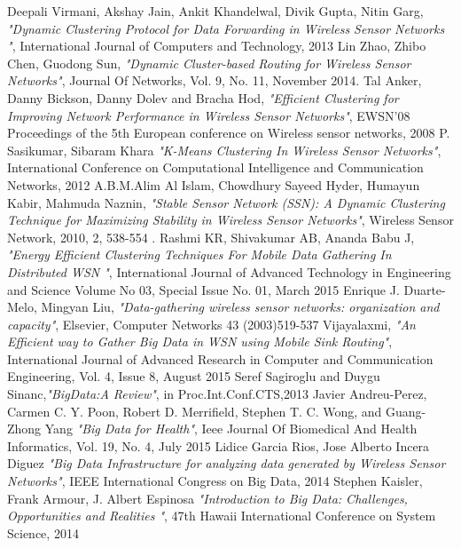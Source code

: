 \documentclass[MTech]{iitmdiss}
\begin{document}
\begin{singlespace}
\begin{thebibliography}{1}
\bibitem{}
Deepali Virmani, Akshay Jain, Ankit Khandelwal, Divik Gupta, Nitin Garg, \textit{"Dynamic Clustering Protocol for Data Forwarding in 
Wireless Sensor Networks
"}, International Journal of Computers and Technology, 2013
\bibitem{}
Lin Zhao, Zhibo Chen, Guodong Sun, \textit{"Dynamic Cluster-based Routing for Wireless
Sensor Networks"}, Journal Of Networks, Vol. 9, No. 11, November 2014.
\bibitem{}
Tal Anker, Danny Bickson, Danny Dolev and Bracha Hod, \textit{"Efficient Clustering for Improving Network Performance in Wireless Sensor Networks"}, EWSN'08 Proceedings of the 5th European conference on Wireless sensor networks, 2008
\bibitem{}
P. Sasikumar, Sibaram Khara \textit{"K-Means Clustering In Wireless Sensor Networks"}, International Conference on Computational Intelligence and Communication Networks, 2012
\bibitem{}
A.B.M.Alim Al Islam, Chowdhury Sayeed Hyder, Humayun Kabir, Mahmuda Naznin, \textit{"Stable Sensor Network (SSN): A Dynamic Clustering 
Technique for Maximizing Stability in Wireless 
Sensor Networks"}, Wireless Sensor Network, 2010, 2, 538-554 .
\bibitem{}
Rashmi KR, Shivakumar AB, Ananda Babu J, \textit{"Energy Efficient Clustering Techniques 
For Mobile Data Gathering In Distributed 
WSN
"}, International Journal of Advanced Technology in Engineering and Science
Volume No 03, Special Issue No. 01, March 2015 
\bibitem{}
Enrique J. Duarte-Melo, Mingyan Liu, \textit{"Data-gathering wireless sensor networks: organization
and capacity"}, Elsevier, Computer Networks 43 (2003)519-537 
\bibitem{}
Vijayalaxmi, \textit{"An Efficient way to Gather Big Data in WSN 
using Mobile Sink Routing"}, International Journal of Advanced Research in Computer and Communication Engineering, Vol. 4, Issue 8, August 2015
\bibitem{}
Seref Sagiroglu and Duygu Sinanc,\textit{"BigData:A Review"}, in Proc.Int.Conf.CTS,2013
\bibitem{}
Javier Andreu-Perez, Carmen C. Y. Poon, Robert D. Merrifield, Stephen T. C. Wong,
and Guang-Zhong Yang \textit{"Big Data for Health"}, Ieee Journal Of Biomedical And Health Informatics, Vol. 19, No. 4, July 2015
\bibitem{}
Lidice Garcia Rios, Jose Alberto Incera Diguez \textit{"Big Data Infrastructure for analyzing data generated by Wireless Sensor Networks"}, IEEE International Congress on Big Data, 2014 
\bibitem{}
Stephen Kaisler, Frank Armour, J. Albert Espinosa \textit{"Introduction to Big Data: Challenges, Opportunities and Realities "}, 47th Hawaii International Conference on System Science, 2014
\end{thebibliography}
\end{singlespace}
\end{document}
